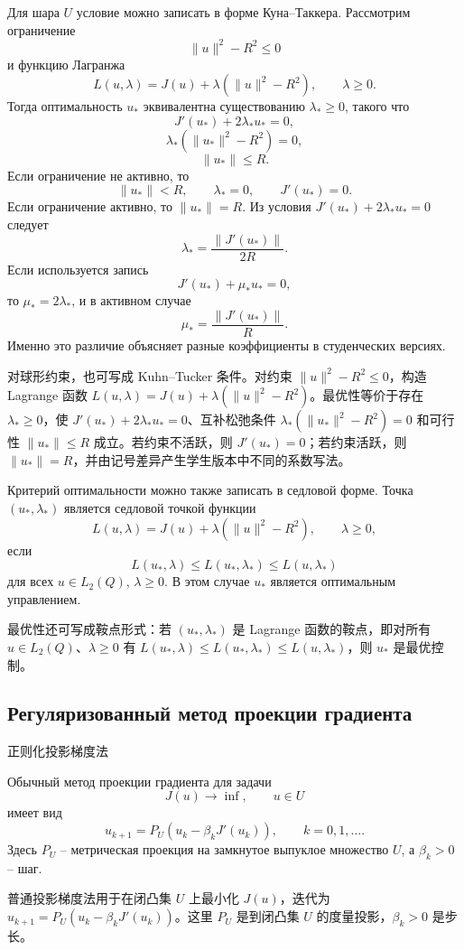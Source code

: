 \documentclass[12pt,a4paper]{article}
\newcommand{\zh}[1]{\par\noindent #1\par}
\begin{document}
Для шара \(U\) условие можно записать в форме Куна--Таккера. Рассмотрим ограничение
\[
\|u\|^2-R^2\le0
\]
и функцию Лагранжа
\[
L(u,\lambda)=J(u)+\lambda(\|u\|^2-R^2),
\qquad \lambda\ge0.
\]
Тогда оптимальность \(u_*\) эквивалентна существованию \(\lambda_*\ge0\), такого что
\[
J'(u_*)+2\lambda_*u_*=0,
\]
\[
\lambda_*(\|u_*\|^2-R^2)=0,
\]
\[
\|u_*\|\le R.
\]
Если ограничение не активно, то
\[
\|u_*\|<R,
\qquad
\lambda_*=0,
\qquad
J'(u_*)=0.
\]
Если ограничение активно, то \(\|u_*\|=R\). Из условия \(J'(u_*)+2\lambda_*u_*=0\) следует
\[
\lambda_*=\frac{\|J'(u_*)\|}{2R}.
\]
Если используется запись
\[
J'(u_*)+\mu_*u_*=0,
\]
то \(\mu_*=2\lambda_*\), и в активном случае
\[
\mu_*=\frac{\|J'(u_*)\|}{R}.
\]
Именно это различие объясняет разные коэффициенты в студенческих версиях.
\zh{对球形约束，也可写成 Kuhn--Tucker 条件。对约束 \(\|u\|^2-R^2\le0\)，构造 Lagrange 函数 \(L(u,\lambda)=J(u)+\lambda(\|u\|^2-R^2)\)。最优性等价于存在 \(\lambda_*\ge0\)，使 \(J'(u_*)+2\lambda_*u_*=0\)、互补松弛条件 \(\lambda_*(\|u_*\|^2-R^2)=0\) 和可行性 \(\|u_*\|\le R\) 成立。若约束不活跃，则 \(J'(u_*)=0\)；若约束活跃，则 \(\|u_*\|=R\)，并由记号差异产生学生版本中不同的系数写法。}

Критерий оптимальности можно также записать в седловой форме. Точка \((u_*,\lambda_*)\) является седловой точкой функции
\[
L(u,\lambda)=J(u)+\lambda(\|u\|^2-R^2),
\qquad \lambda\ge0,
\]
если
\[
L(u_*,\lambda)\le L(u_*,\lambda_*)\le L(u,\lambda_*)
\]
для всех \(u\in L_2(Q)\), \(\lambda\ge0\). В этом случае \(u_*\) является оптимальным управлением.
\zh{最优性还可写成鞍点形式：若 \((u_*,\lambda_*)\) 是 Lagrange 函数的鞍点，即对所有 \(u\in L_2(Q)\)、\(\lambda\ge0\) 有 \(L(u_*,\lambda)\le L(u_*,\lambda_*)\le L(u,\lambda_*)\)，则 \(u_*\) 是最优控制。}

\subsection*{Регуляризованный метод проекции градиента}
\zh{正则化投影梯度法}
Обычный метод проекции градиента для задачи
\[
J(u)\to\inf,
\qquad u\in U
\]
имеет вид
\[
u_{k+1}=P_U\left(u_k-\beta_kJ'(u_k)\right),
\qquad k=0,1,\ldots .
\]
Здесь \(P_U\) -- метрическая проекция на замкнутое выпуклое множество \(U\), а \(\beta_k>0\) -- шаг.
\zh{普通投影梯度法用于在闭凸集 \(U\) 上最小化 \(J(u)\)，迭代为 \(u_{k+1}=P_U(u_k-\beta_kJ'(u_k))\)。这里 \(P_U\) 是到闭凸集 \(U\) 的度量投影，\(\beta_k>0\) 是步长。}

\end{document}
